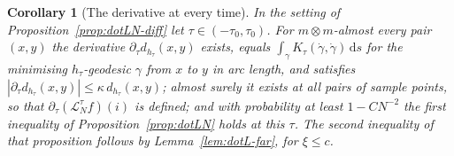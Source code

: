 \documentclass[11pt,a4paper]{article}
\theoremstyle{stmt}
\newtheorem{corollary}[theorem]{Corollary}
\theoremstyle{defn}
\theoremstyle{rmk}
\numberwithin{equation}{section}
\newcommand{\Lc}{\mathcal{L}}
\newcommand{\dd}{\mathrm{d}}
\begin{document}
{\begin{corollary}[The derivative at every time]\label{cor:dotLN-ae}
In the setting of Proposition~\ref{prop:dotLN-diff} let $\tau\in(-\tau_0,\tau_0)$. For $m\otimes m$-almost every pair $(x,y)$ the derivative $\partial_\tau d_{h_\tau}(x,y)$ exists, equals $\int_\gamma K_\tau(\dot\gamma,\dot\gamma)\,\dd s$ for the minimising $h_\tau$-geodesic $\gamma$ from $x$ to $y$ in arc length, and satisfies $|\partial_\tau d_{h_\tau}(x,y)|\le\kappa\,d_{h_\tau}(x,y)$; almost surely it exists at all pairs of sample points, so that $\partial_\tau(\Lc^\tau_Nf)(i)$ is defined; and with probability at least $1-CN^{-2}$ the first inequality of Proposition~\ref{prop:dotLN} holds at this $\tau$. The second inequality of that proposition follows by Lemma~\ref{lem:dotL-far}, for $\xi\le c$.
\end{corollary}

}
\end{document}
